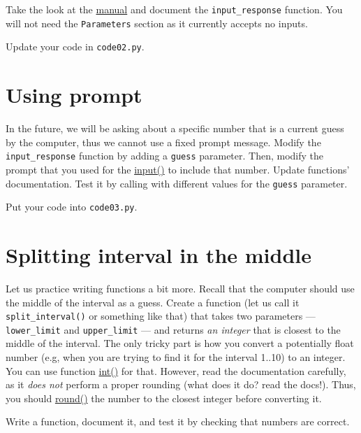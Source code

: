 \documentclass[
]{book}
\begin{document}
Take the look at the \href{https://numpydoc.readthedocs.io/en/latest/format.html\#docstring-standard}{manual} and document the \texttt{input\_response} function. You will not need the \texttt{Parameters} section as it currently accepts no inputs.

Update your code in \texttt{code02.py}.

\hypertarget{using-prompt}{%
\section{Using prompt}\label{using-prompt}}

In the future, we will be asking about a specific number that is a current guess by the computer, thus we cannot use a fixed prompt message. Modify the \texttt{input\_response} function by adding a \texttt{guess} parameter. Then, modify the prompt that you used for the \href{https://docs.python.org/3/library/functions.html\#input}{input()} to include that number. Update functions' documentation. Test it by calling with different values for the \texttt{guess} parameter.

Put your code into \texttt{code03.py}.

\hypertarget{splitting-interval-in-the-middle}{%
\section{Splitting interval in the middle}\label{splitting-interval-in-the-middle}}

Let us practice writing functions a bit more. Recall that the computer should use the middle of the interval as a guess. Create a function (let us call it \texttt{split\_interval()} or something like that) that takes two parameters --- \texttt{lower\_limit} and \texttt{upper\_limit} --- and returns \emph{an integer} that is closest to the middle of the interval. The only tricky part is how you convert a potentially float number (e.g, when you are trying to find it for the interval 1..10) to an integer. You can use function \href{https://docs.python.org/3/library/functions.html\#int}{int()} for that. However, read the documentation carefully, as it \emph{does not} perform a proper rounding (what does it do? read the docs!). Thus, you should \href{https://docs.python.org/3/library/functions.html\#round}{round()} the number to the closest integer before converting it.

Write a function, document it, and test it by checking that numbers are correct.
\end{document}
